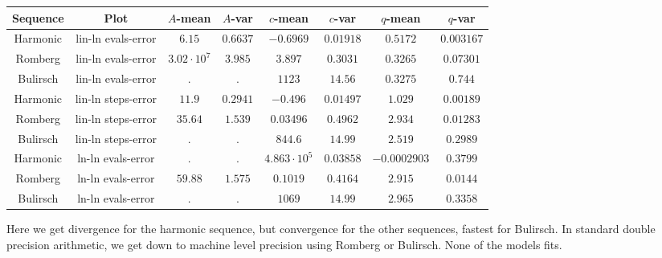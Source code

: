 \begin{table}[H]
    \centering
        \small
    \begin{tabular}{c|c||c|c|c|c|c	|c}
Sequence & Plot & \(A\)-mean & \(A\)-var & \(c\)-mean & \(c\)-var & \(q\)-mean & \(q\)-var\\\hline
Harmonic & lin-ln evals-error & \(6.15\) & \(0.6637\) & \(-0.6969\) & \(0.01918\) & \(0.5172\) & \(0.003167\) \\
Romberg & lin-ln evals-error & \(3.02\cdot 10^7\) & \(3.985\) & \(3.897\) & \(0.3031\) & \(0.3265\) & \(0.07301\) \\
Bulirsch & lin-ln evals-error & \(.\) & \(.\) & \(1123\) & \(14.56\) & \(0.3275\) & \(0.744\) \\
Harmonic & lin-ln steps-error & \(11.9\) & \(0.2941\) & \(-0.496\) & \(0.01497\) & \(1.029\) & \(0.00189\) \\
Romberg & lin-ln steps-error & \(35.64\) & \(1.539\) & \(0.03496\) & \(0.4962\) & \(2.934\) & \(0.01283\) \\
Bulirsch & lin-ln steps-error & \(.\) & \(.\) & \(844.6\) & \(14.99\) & \(2.519\) & \(0.2989\) \\
Harmonic & ln-ln evals-error & \(.\) & \(.\) & \(4.863\cdot 10^5\) & \(0.03858\) & \(-0.0002903\) & \(0.3799\) \\
Romberg & ln-ln evals-error & \(59.88\) & \(1.575\) & \(0.1019\) & \(0.4164\) & \(2.915\) & \(0.0144\) \\
Bulirsch & ln-ln evals-error & \(.\) & \(.\) & \(1069\) & \(14.99\) & \(2.965\) & \(0.3358\) \\
    \end{tabular}
    \label{tab:my_label}
\end{table}

Here we get divergence for the harmonic sequence, but convergence for the other sequences, fastest for Bulirsch. In standard double precision arithmetic, we get down to machine level precision using Romberg or Bulirsch. None of the models fits.

